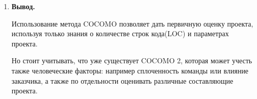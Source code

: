 \documentclass[a4paper,14pt]{extreport} %
\begin{document}
\begin{enumerate}
\item \textbf{Вывод.}

Использование метода COCOMO позволяет дать первичную оценку проекта, используя только знания о количестве строк кода(LOC) и параметрах проекта. 

Но стоит учитывать, что уже существует COCOMO 2, которая может учесть также человеческие факторы: например сплоченность команды или влияние заказчика, а также по отдельности оценивать различные составляющие проекта. 

\end{enumerate}
\end{document}
